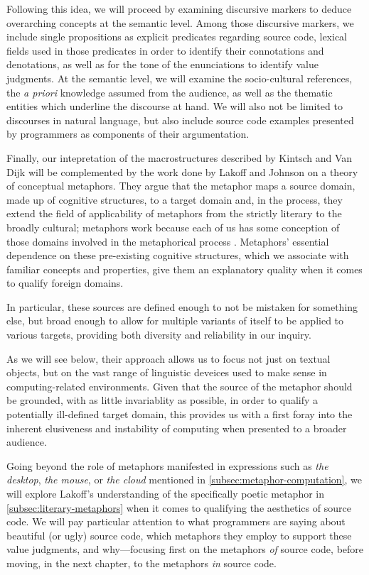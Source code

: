 Following this idea, we will proceed by examining discursive markers to deduce overarching concepts at the semantic level. Among those discursive markers, we include single propositions as explicit predicates regarding source code, lexical fields used in those predicates in order to identify their connotations and denotations, as well as for the tone of the enunciations to identify value judgments. At the semantic level, we will examine the socio-cultural references, the \emph{a priori} knowledge assumed from the audience, as well as the thematic entities which underline the discourse at hand. We will also not be limited to discourses in natural language, but also include source code examples presented by programmers as components of their argumentation.

Finally, our intepretation of the macrostructures described by Kintsch and Van Dijk will be complemented by the work done by Lakoff and Johnson on a theory of conceptual metaphors. They argue that the metaphor maps a source domain, made up of cognitive structures, to a target domain and, in the process, they extend the field of applicability of metaphors from the strictly literary to the broadly cultural; metaphors work because each of us has some conception of those domains involved in the metaphorical process \citep{lakoff_metaphors_1980,lakoff_conceptual_1980}.  Metaphors' essential dependence on these pre-existing cognitive structures, which we associate with familiar concepts and properties, give them an explanatory quality when it comes to qualify foreign domains.

In particular, these sources are defined enough to not be mistaken for something else, but broad enough to allow for multiple variants of itself to be applied to various targets, providing both diversity and reliability in our inquiry.

As we will see below, their approach allows us to focus not just on textual objects, but on the vast range of linguistic deveices used to make sense in computing-related environments. Given that the source of the metaphor should be grounded, with as little invariablity as possible, in order to qualify a potentially ill-defined target domain, this provides us with a first foray into the inherent elusiveness and instability of computing when presented to a broader audience.

Going beyond the role of metaphors manifested in expressions such as \emph{the desktop}, \emph{the mouse}, or \emph{the cloud} mentioned in \ref{subsec:metaphor-computation}, we will explore Lakoff's understanding of the specifically poetic metaphor in \ref{subsec:literary-metaphors} when it comes to qualifying the aesthetics of source code. We will pay particular attention to what programmers are saying about beautiful (or ugly) source code, which metaphors they employ to support these value judgments, and why—focusing first on the metaphors \emph{of} source code, before moving, in the next chapter, to the metaphors \emph{in} source code.

